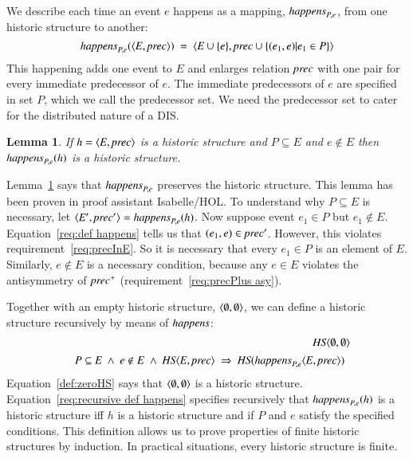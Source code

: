 \documentclass{elsarticle}
\newtheorem{lemma}{Lemma}
\def\id#1{\text{\em #1\/}}
\def\Events{{\mathit E}}
\begin{document}
	We describe each time an event $e$ happens as a mapping, $\id{happens}_{P,e}$, from one historic structure to another:
\begin{equation}
	\id{happens}_{P,e}(\la \Events, \id{prec}\ra)\ =\ \la \Events\cup\{e\}, \id{prec}\cup\{(e_1,e) | e_1\in P\}\ra
\label{req:def happens}
\end{equation}
	This happening adds one event to $\Events$ and enlarges relation $\id{prec}$ with one pair for every immediate predecessor of $e$.
	The immediate predecessors of $e$ are specified in set $P$, which we call the predecessor set.
	We need the predecessor set to cater for the distributed nature of a DIS.

\begin{lemma}
\label{lemma:happens preserves historic structure}
	If $h=\la \Events, \id{prec}\ra$ is a historic structure and $P\subseteq\Events$ and $e\notin\Events$
	then $\id{happens}_{P,e}(h)$ is a historic structure.
\end{lemma}
	Lemma~\ref{lemma:happens preserves historic structure} says that $\id{happens}_{P,e}$ preserves the historic structure.
	This lemma has been proven in proof assistant Isabelle/HOL.
	To understand why $P\subseteq\Events$ is necessary,
	let $\la \Events', \id{prec}'\ra=\id{happens}_{P,e}(h)$.
	Now suppose event $e_1\in P$ but $e_1\notin\Events$.
	Equation~\ref{req:def happens} tells us that $(e_1,e)\in\id{prec}'$.
	However, this violates requirement~\ref{req:precInE}.
	So it is necessary that every $e_1\in P$ is an element of $\Events$.
	Similarly, $e\notin\Events$ is a necessary condition,
	because any $e\in\Events$ violates the antisymmetry of $\id{prec}^+$ (requirement~\ref{req:precPlus asy}).

	Together with an empty historic structure, $\langle \emptyset, \emptyset\rangle$,
	we can define a historic structure recursively by means of $\id{happens}$:
\begin{eqnarray}
	&&\id{HS}\la \emptyset, \emptyset\ra\label{def:zeroHS}\\
&&\begin{array}{@{}l}
	P\subseteq\Events\ \wedge\ e\notin E\ \wedge\ \id{HS}\la \Events, \id{prec}\ra\ \Rightarrow\ \id{HS}(\id{happens}_{P,e}\la \Events, \id{prec}\ra)
\end{array}
\label{req:recursive def happens}
\end{eqnarray}
	Equation~\ref{def:zeroHS} says that $\langle \emptyset, \emptyset\rangle$ is a historic structure.
	Equation~\ref{req:recursive def happens} specifies recursively that $\id{happens}_{P,e}(h)$ is a historic structure iff
	$h$ is a historic structure and if $P$ and $e$ satisfy the specified conditions.
	This definition allows us to prove properties of finite historic structures by induction.
	In practical situations, every historic structure is finite.
\end{document}
